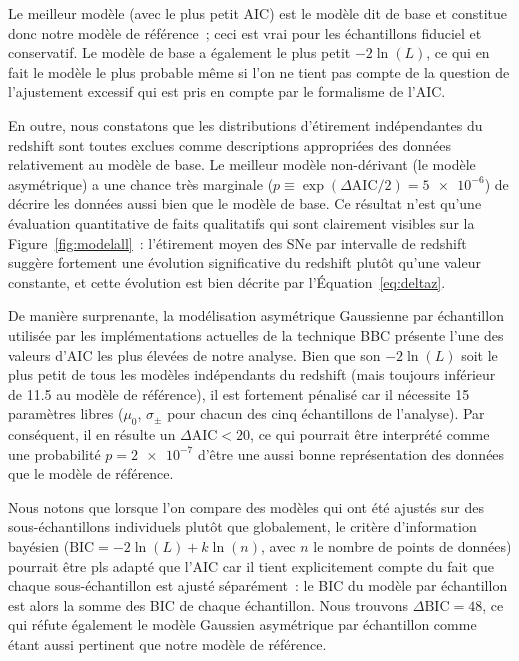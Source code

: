 \documentclass[../main/main.tex]{subfiles}
\begin{document}
Le meilleur modèle (avec le plus petit AIC) est le modèle dit de base et
constitue donc notre modèle de référence~; ceci est vrai pour les échantillons
fiduciel et conservatif. Le modèle de base a également le plus petit $-2\ln(L)$,
ce qui en fait le modèle le plus probable même si l'on ne tient pas compte de la
question de l'ajustement excessif qui est pris en compte par le formalisme de
l'AIC.

En outre, nous constatons que les distributions d'étirement indépendantes du
redshift sont toutes exclues comme descriptions appropriées des données
relativement au modèle de base. Le meilleur modèle  non-dérivant (le modèle
asymétrique) a une chance très marginale ($p \equiv \exp(\Delta\mathrm{AIC}/2) =
\num{5e-6}$) de décrire les données aussi bien que le modèle de base. Ce
résultat n'est qu'une évaluation quantitative de faits qualitatifs qui sont
clairement visibles sur la Figure~\ref{fig:modelall}~: l'étirement moyen des SNe
par intervalle de redshift suggère fortement une évolution significative du
redshift plutôt qu'une valeur constante, et cette évolution est bien décrite par
l'Équation~\ref{eq:deltaz}.

De manière surprenante, la modélisation asymétrique Gaussienne par échantillon
utilisée par les implémentations actuelles de la technique BBC
\citep{scolnic2016, kessler2017} présente l'une des valeurs d'AIC les plus
élevées de notre analyse. Bien que son $-2\ln(L)$ soit le plus petit de tous les
modèles indépendants du redshift (mais toujours inférieur de \num{11.5} au
modèle de référence), il est fortement pénalisé car il nécessite 15 paramètres
libres ($\mu_0$, $\sigma_{\pm}$ pour chacun des cinq échantillons de l'analyse).
Par conséquent, il en résulte un $\Delta\mathrm{AIC} < 20$, ce qui pourrait être
interprété comme une probabilité $p = \num{2e-7}$ d'être une aussi bonne
représentation des données que le modèle de référence.

Nous notons que lorsque l'on compare des modèles qui ont été ajustés sur des
sous-échantillons individuels plutôt que globalement, le critère d'information
bayésien ($\mathrm{BIC} = -2\ln(L) + k\ln(n)$, avec $n$ le nombre de points de
données) pourrait être pls adapté que l'AIC car il tient explicitement compte du
fait que chaque sous-échantillon est ajusté séparément~: le BIC du modèle par
échantillon est alors la somme des BIC de chaque échantillon. Nous trouvons
$\Delta\mathrm{BIC} = 48$, ce qui réfute également le modèle Gaussien
asymétrique par échantillon comme étant aussi pertinent que notre modèle de
référence.
\end{document}
